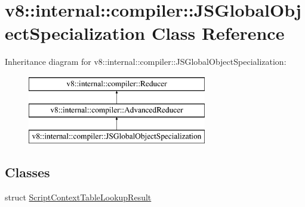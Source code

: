 \hypertarget{classv8_1_1internal_1_1compiler_1_1_j_s_global_object_specialization}{}\section{v8\+:\+:internal\+:\+:compiler\+:\+:J\+S\+Global\+Object\+Specialization Class Reference}
\label{classv8_1_1internal_1_1compiler_1_1_j_s_global_object_specialization}
Inheritance diagram for v8\+:\+:internal\+:\+:compiler\+:\+:J\+S\+Global\+Object\+Specialization\+:\begin{figure}[H]
\begin{center}
\leavevmode
\includegraphics[height=3.000000cm]{classv8_1_1internal_1_1compiler_1_1_j_s_global_object_specialization}
\end{center}
\end{figure}
\subsection*{Classes}
\begin{DoxyCompactItemize}
\item 
struct \hyperlink{structv8_1_1internal_1_1compiler_1_1_j_s_global_object_specialization_1_1_script_context_table_lookup_result}{Script\+Context\+Table\+Lookup\+Result}
\end{DoxyCompactItemize}
